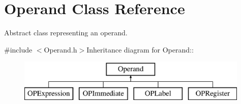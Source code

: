 \hypertarget{classOperand}{
\section{Operand Class Reference}
\label{classOperand}
}


Abstract class representing an operand.  


{\ttfamily \#include $<$Operand.h$>$}Inheritance diagram for Operand::\begin{figure}[H]
\begin{center}
\leavevmode
\includegraphics[height=2cm]{classOperand}
\end{center}
\end{figure}
